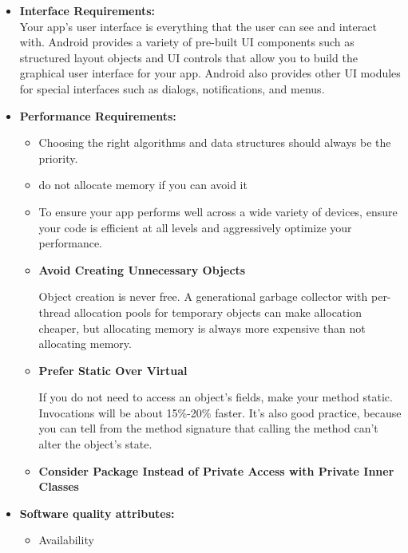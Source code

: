 \documentclass[12pt,a4paper]{report}
\begin{document}
\begin{itemize}
	\item \textbf{Interface Requirements:}\\
Your app's user interface is everything that the user can see and interact with. Android provides a variety of pre-built UI components such as structured layout objects and UI controls that allow you to build the graphical user interface for your app. Android also provides other UI modules for special interfaces such as dialogs, notifications, and menus.

\item	\textbf{Performance Requirements:}
\begin{itemize}
\item Choosing the right algorithms and data structures should always be the priority. 
\item	do not allocate memory if you can avoid it
\item	To ensure your app performs well across a wide variety of devices, ensure your code is efficient at all levels and aggressively optimize your performance.\\
\end{itemize}
\begin{itemize}
\item	\textbf{Avoid Creating Unnecessary Objects}

Object creation is never free. A generational garbage collector with per-thread allocation pools for temporary objects can make allocation cheaper, but allocating memory is always more expensive than not allocating memory.

\item \textbf{Prefer Static Over Virtual}

If you do not need to access an object's fields, make your method static. Invocations will be about 15\%-20\% faster. It's also good practice, because you can tell from the method signature that calling the method can't alter the object's state.
\item \textbf{Consider Package Instead of Private Access with Private Inner Classes}
	
\end{itemize}
\item \textbf{Software quality attributes:}
	\begin{itemize}
		\item Availability
		

\end{itemize}
\end{itemize}
\end{document}
